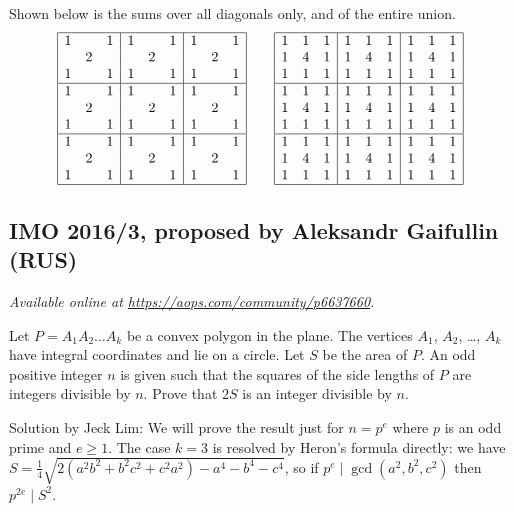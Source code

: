 \documentclass[11pt]{scrartcl}
\begin{document}
Shown below is the sums over all diagonals only,
and of the entire union.
\[
 \begin{array}{|ccc|ccc|ccc|} \hline
  1 &   & 1 & 1 &   & 1 & 1 &   & 1 \\
  & 2 &   &   & 2 &   &   & 2 &   \\
  1 &   & 1 & 1 &   & 1 & 1 &   & 1 \\\hline
  1 &   & 1 & 1 &   & 1 & 1 &   & 1 \\
  & 2 &   &   & 2 &   &   & 2 &   \\
  1 &   & 1 & 1 &   & 1 & 1 &   & 1 \\\hline
  1 &   & 1 & 1 &   & 1 & 1 &   & 1 \\
  & 2 &   &   & 2 &   &   & 2 &   \\
  1 &   & 1 & 1 &   & 1 & 1 &   & 1 \\\hline
 \end{array}
 \qquad
 \begin{array}{|ccc|ccc|ccc|} \hline
    1 & 1 & 1 & 1 & 1 & 1 & 1 & 1 & 1 \\
    1 & 4 & 1 & 1 & 4 & 1 & 1 & 4 & 1 \\
    1 & 1 & 1 & 1 & 1 & 1 & 1 & 1 & 1 \\\hline
    1 & 1 & 1 & 1 & 1 & 1 & 1 & 1 & 1 \\
    1 & 4 & 1 & 1 & 4 & 1 & 1 & 4 & 1 \\
    1 & 1 & 1 & 1 & 1 & 1 & 1 & 1 & 1 \\\hline
    1 & 1 & 1 & 1 & 1 & 1 & 1 & 1 & 1 \\
    1 & 4 & 1 & 1 & 4 & 1 & 1 & 4 & 1 \\
    1 & 1 & 1 & 1 & 1 & 1 & 1 & 1 & 1 \\\hline
 \end{array}
\]
\pagebreak

\subsection{IMO 2016/3, proposed by Aleksandr Gaifullin (RUS)}
\textsl{Available online at \url{https://aops.com/community/p6637660}.}
\begin{mdframed}[style=mdpurplebox,frametitle={Problem statement}]
Let $P=A_1A_2\dots A_k$ be a convex polygon in the plane.
The vertices $A_1$, $A_2$, \dots, $A_k$ have integral coordinates
and lie on a circle. Let $S$ be the area of $P$.
An odd positive integer $n$ is given such that
the squares of the side lengths of $P$ are integers divisible by $n$.
Prove that $2S$ is an integer divisible by $n$.
\end{mdframed}
Solution by Jeck Lim:
We will prove the result just for $n = p^e$
where $p$ is an odd prime and $e \ge 1$.
The case $k=3$ is resolved by Heron's formula directly:
we have $S = \frac14\sqrt{2(a^2b^2 + b^2c^2 + c^2a^2) - a^4-b^4-c^4}$,
so if $p^e \mid \gcd(a^2,b^2,c^2)$ then $p^{2e} \mid S^2$.
\end{document}
